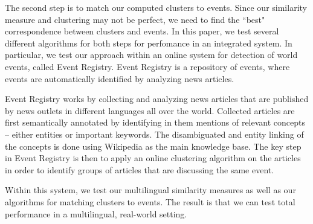 \documentclass[twoside,11pt]{article}
\begin{document}
The second step is to match our computed clusters to events. Since our similarity measure and clustering
may not be perfect, we need to find the ``best" correspondence between clusters and events. In this paper, we test several different algorithms for both steps for perfomance in an integrated system. In particular, we test our approach within an online system for detection of world events, called Event Registry\cite{}. Event Registry is a repository of events, where events are automatically identified by analyzing news articles.

Event Registry works by collecting and analyzing news articles that are published by news outlets in different languages all over the world. Collected articles are first semantically annotated by identifying in them mentions of relevant concepts -- either entities or important keywords. The disambiguated and entity linking of the concepts is done using Wikipedia as the main knowledge base.
   The key step in Event Registry is then to apply an online clustering algorithm on the articles in order to identify groups of articles that are discussing the same event.

   Within this system, we test our multilingual similarity measures as well as our algorithms for matching clusters to events.  The result is that we can test total performance in a multilingual, real-world setting.
\end{document}
